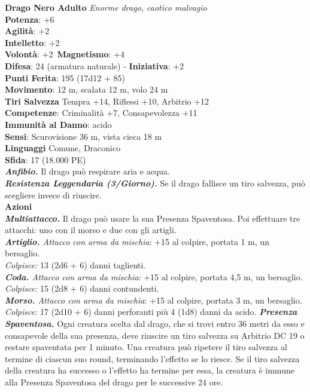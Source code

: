 \begin{multicols}{2}
\medskip\textbf{Drago Nero Adulto}
\emph{Enorme drago, caotico malvagio}\\
\textbf{Potenza}: +6\\
\textbf{Agilità}: +2\\
\textbf{Intelletto}: +2\\
\textbf{Volontà}: +2\
\textbf{Magnetismo}: +4\\
\textbf{Difesa}: 24 (armatura naturale) - \textbf{Iniziativa}: +2\\
\textbf{Punti Ferita}: 195 (17d12 + 85)\\
\textbf{Movimento}: 12 m, scalata 12 m, volo 24 m\\
\textbf{Tiri Salvezza} Tempra +14, Riflessi +10, Arbitrio +12\\
\textbf{Competenze}: Criminalità +7, Consapevolezza +11\\
\textbf{Immunità al Danno}: acido\\
\textbf{Sensi}: Scurovisione 36 m, vista cieca 18 m\\
\textbf{Linguaggi} Comune, Draconico\\
\textbf{Sfida}: 17 (18.000 PE)\smallskip\\
\emph{\textbf{Anfibio.}} Il drago può respirare aria e acqua.\\
\emph{\textbf{Resistenza Leggendaria (3/Giorno).}} Se il drago fallisce un tiro salvezza, può scegliere invece di riuscire.\\
\smallskip\textbf{Azioni}\\
\emph{\textbf{Multiattacco.}} Il drago può usare la sua Presenza Spaventosa. Poi effettuare tre attacchi: uno con il morso e due con gli artigli.\\
\emph{\textbf{Artiglio.} Attacco con arma da mischia}: +15 al colpire, portata 1 m, un bersaglio.\\
\emph{Colpisce:} 13 (2d6 + 6) danni taglienti.\\
\emph{\textbf{Coda.} Attacco con arma da mischia}: +15 al colpire, portata 4,5 m, un bersaglio.\\
\emph{Colpisce:} 15 (2d8 + 6) danni contundenti. \\
\emph{\textbf{Morso.} Attacco con arma da mischia}: +15 al colpire, portata 3 m, un bersaglio.\\
\emph{Colpisce:} 17 (2d10 + 6) danni perforanti più 4 (1d8) danni da acido.
\emph{\textbf{Presenza Spaventosa.}} Ogni creatura scelta dal drago, che si trovi entro 36 metri da esso e consapevole della sua presenza, deve riuscire un tiro salvezza su Arbitrio DC  19 o restare spaventata per 1 minuto. Una creatura può ripetere il tiro salvezza al termine di ciascun suo round, terminando l'effetto se lo riesce. Se il tiro salvezza della creatura ha successo o l'effetto ha termine per essa, la creatura è immune alla Presenza Spaventosa del drago per le successive 24 ore.\\

\end{multicols}
